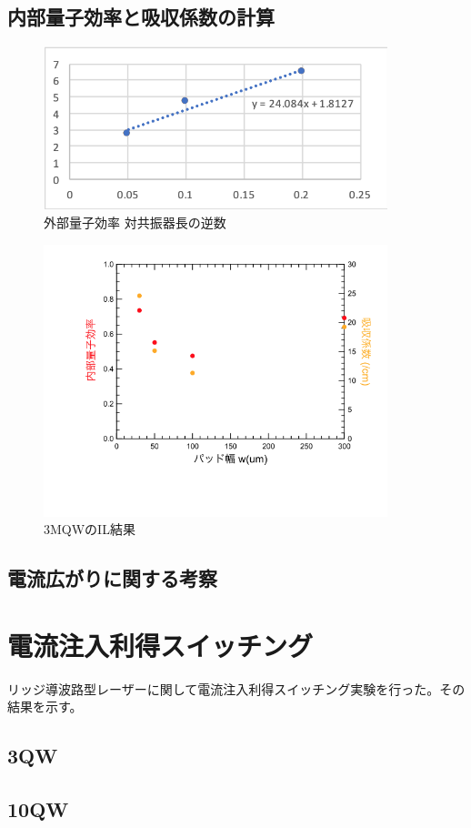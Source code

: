 \subsection{内部量子効率と吸収係数の計算}%
\begin{figure}[htbp]
	\centering
	\includegraphics[width=10cm]{figure/fig_efficientcy_vs_L_inverce.png}
	\caption{外部量子効率 対共振器長の逆数}
	\label{fig:efficientcy_vs_L_inverce}
\end{figure}
\begin{figure}[h]
	\centering
	\includegraphics[width=10cm]{figure/fig_3_1_eff_in_3QW.png}
		\caption{3MQWのIL結果}
		\label{fig_3_1_IL_broad_i_th_3QW}
\end{figure}
\subsection{電流広がりに関する考察}%

\newpage
\newpage
\newpage
\section{電流注入利得スイッチング}%
リッジ導波路型レーザーに関して電流注入利得スイッチング実験を行った。その結果を示す。
\subsection{3QW}%

\subsection{10QW}%


